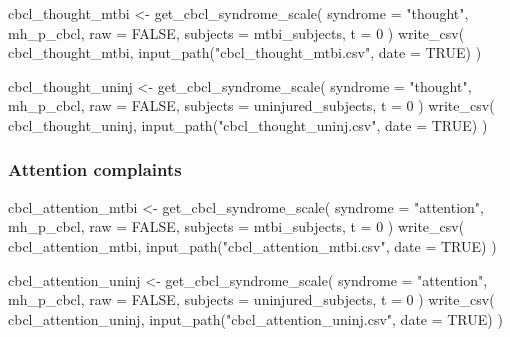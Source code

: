 \documentclass[
  letterpaper,
  DIV=11,
  numbers=noendperiod]{scrreprt}
\newenvironment{Shaded}{\begin{snugshade}}{\end{snugshade}}
\newcommand{\AttributeTok}[1]{\textcolor[rgb]{0.40,0.45,0.13}{#1}}
\newcommand{\ConstantTok}[1]{\textcolor[rgb]{0.56,0.35,0.01}{#1}}
\newcommand{\DecValTok}[1]{\textcolor[rgb]{0.68,0.00,0.00}{#1}}
\newcommand{\FunctionTok}[1]{\textcolor[rgb]{0.28,0.35,0.67}{#1}}
\newcommand{\NormalTok}[1]{\textcolor[rgb]{0.00,0.23,0.31}{#1}}
\newcommand{\OtherTok}[1]{\textcolor[rgb]{0.00,0.23,0.31}{#1}}
\newcommand{\StringTok}[1]{\textcolor[rgb]{0.13,0.47,0.30}{#1}}
\begin{document}
\begin{Shaded}
\begin{Highlighting}[]
\NormalTok{cbcl\_thought\_mtbi }\OtherTok{\textless{}{-}} \FunctionTok{get\_cbcl\_syndrome\_scale}\NormalTok{(}
    \AttributeTok{syndrome =} \StringTok{"thought"}\NormalTok{,}
\NormalTok{    mh\_p\_cbcl,}
    \AttributeTok{raw =} \ConstantTok{FALSE}\NormalTok{,}
    \AttributeTok{subjects =}\NormalTok{ mtbi\_subjects,}
    \AttributeTok{t =} \DecValTok{0}
\NormalTok{)}
\FunctionTok{write\_csv}\NormalTok{(}
\NormalTok{    cbcl\_thought\_mtbi,}
    \FunctionTok{input\_path}\NormalTok{(}\StringTok{"cbcl\_thought\_mtbi.csv"}\NormalTok{, }\AttributeTok{date =} \ConstantTok{TRUE}\NormalTok{)}
\NormalTok{)}

\NormalTok{cbcl\_thought\_uninj }\OtherTok{\textless{}{-}} \FunctionTok{get\_cbcl\_syndrome\_scale}\NormalTok{(}
    \AttributeTok{syndrome =} \StringTok{"thought"}\NormalTok{,}
\NormalTok{    mh\_p\_cbcl,}
    \AttributeTok{raw =} \ConstantTok{FALSE}\NormalTok{,}
    \AttributeTok{subjects =}\NormalTok{ uninjured\_subjects,}
    \AttributeTok{t =} \DecValTok{0}
\NormalTok{)}
\FunctionTok{write\_csv}\NormalTok{(}
\NormalTok{    cbcl\_thought\_uninj,}
    \FunctionTok{input\_path}\NormalTok{(}\StringTok{"cbcl\_thought\_uninj.csv"}\NormalTok{, }\AttributeTok{date =} \ConstantTok{TRUE}\NormalTok{)}
\NormalTok{)}
\end{Highlighting}
\end{Shaded}

\subsubsection{Attention complaints}\label{attention-complaints}

\begin{Shaded}
\begin{Highlighting}[]
\NormalTok{cbcl\_attention\_mtbi }\OtherTok{\textless{}{-}} \FunctionTok{get\_cbcl\_syndrome\_scale}\NormalTok{(}
    \AttributeTok{syndrome =} \StringTok{"attention"}\NormalTok{,}
\NormalTok{    mh\_p\_cbcl,}
    \AttributeTok{raw =} \ConstantTok{FALSE}\NormalTok{,}
    \AttributeTok{subjects =}\NormalTok{ mtbi\_subjects,}
    \AttributeTok{t =} \DecValTok{0}
\NormalTok{)}
\FunctionTok{write\_csv}\NormalTok{(}
\NormalTok{    cbcl\_attention\_mtbi,}
    \FunctionTok{input\_path}\NormalTok{(}\StringTok{"cbcl\_attention\_mtbi.csv"}\NormalTok{, }\AttributeTok{date =} \ConstantTok{TRUE}\NormalTok{)}
\NormalTok{)}

\NormalTok{cbcl\_attention\_uninj }\OtherTok{\textless{}{-}} \FunctionTok{get\_cbcl\_syndrome\_scale}\NormalTok{(}
    \AttributeTok{syndrome =} \StringTok{"attention"}\NormalTok{,}
\NormalTok{    mh\_p\_cbcl,}
    \AttributeTok{raw =} \ConstantTok{FALSE}\NormalTok{,}
    \AttributeTok{subjects =}\NormalTok{ uninjured\_subjects,}
    \AttributeTok{t =} \DecValTok{0}
\NormalTok{)}
\FunctionTok{write\_csv}\NormalTok{(}
\NormalTok{    cbcl\_attention\_uninj,}
    \FunctionTok{input\_path}\NormalTok{(}\StringTok{"cbcl\_attention\_uninj.csv"}\NormalTok{, }\AttributeTok{date =} \ConstantTok{TRUE}\NormalTok{)}
\NormalTok{)}
\end{Highlighting}
\end{Shaded}
\end{document}
